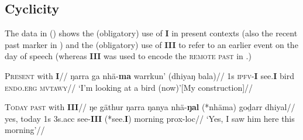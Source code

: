 \documentclass[11pt]{article}
\begin{document}
\subsection*{Cyclicity}

The data in (\nextx) shows the (obligatory) use of \textbf{I} in present contexts (also the recent past marker in ) and the (obligatory) use of \textbf{III} to refer to an earlier event on the day of speech (whereas \textbf{III} was used to encode the \textsc{remote past} in .)

\pex\a\begingl\glpreamble\textsc{Present} with \textbf{I}//
\gla ŋarra ga nhä-\textbf{ma} warrkun' (dhiyaŋ bala)//
\glb 1s \textsc{ipfv}-\textbf{I} see.\textbf{I} bird \textsc{endo}.\textsc{erg} \textsc{mvtawy}//
\glft`I'm looking at a bird (now)'\hfill{[My construction]}//
\endgl

\a\begingl\glpreamble\textsc{Today past} with \textbf{III}//
\gla ŋe gäthur ŋarra ŋanya nhä-\textbf{ŋal} (*nhäma) goḏarr dhiyal//
\glb	yes, today 1s 3s{\sc.acc} see-\textbf{III} (*see.\textbf{I}) morning {\sc prox-loc}//
\glft`Yes, I saw him here this morning'//\endgl

\xe
\end{document}
